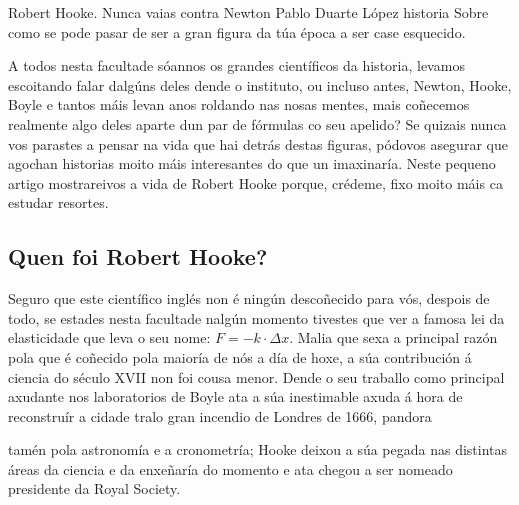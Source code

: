 \Titular%
{Robert Hooke. Nunca vaias contra Newton}%
{Pablo Duarte López}%
{historia}%
{Sobre como se pode pasar de ser a gran figura da túa época a ser case esquecido.}

\begin{refsection}
\begin{multicols}{2}


A todos nesta facultade sóannos os grandes científicos da historia, levamos
escoitando falar dalgúns deles dende o instituto, ou incluso antes, Newton,
Hooke, Boyle e tantos máis levan anos roldando nas nosas mentes, mais coñecemos
realmente algo deles aparte dun par de fórmulas co seu apelido? Se quizais
nunca vos parastes a pensar na vida que hai detrás destas figuras, pódovos
asegurar que agochan historias moito máis interesantes do que un imaxinaría.
Neste pequeno artigo mostrareivos a vida de Robert Hooke porque, crédeme, fixo
moito máis ca estudar resortes.

\subsection*{Quen foi Robert Hooke?}

Seguro que este científico inglés non é ningún descoñecido para vós, despois de
todo, se estades nesta facultade nalgún momento tivestes que ver a famosa lei
da elasticidade que leva o seu nome: $F= -k\cdot\Delta x$. Malia que sexa a
principal razón pola que é coñecido pola maioría de nós a día de hoxe, a súa
contribución á ciencia do século XVII non foi cousa menor. Dende o seu traballo
como principal axudante nos laboratorios de Boyle ata a súa inestimable axuda á
hora de reconstruír a cidade tralo gran incendio de Londres de 1666, pandora

tamén pola astronomía e a cronometría; Hooke deixou a súa pegada nas distintas
áreas da ciencia e da enxeñaría do momento e ata chegou a ser nomeado
presidente da Royal Society.


\end{multicols}
\end{refsection}
